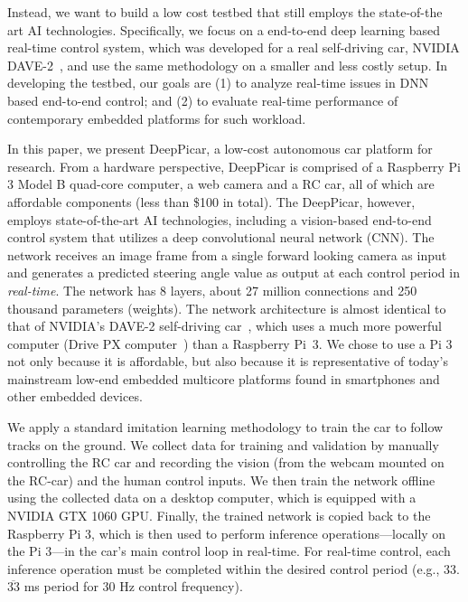 Instead, we want to build a low cost testbed that still employs the
state-of-the art AI technologies. Specifically, we focus on a end-to-end
deep learning based real-time control system,
which was developed for a real self-driving car, NVIDIA
DAVE-2~\cite{Bojarski2016}, and use the same methodology on a
smaller and less costly setup. In developing the testbed, our
goals are (1) to analyze real-time issues in DNN based end-to-end
control; and (2) to evaluate real-time performance of contemporary embedded
platforms for such workload.

In this paper, we present DeepPicar, a low-cost autonomous car
platform for research. From a hardware perspective,
DeepPicar is comprised of a Raspberry Pi 3 Model B quad-core
computer, a web camera and a RC car, all of which are affordable
components (less than \$100 in total).
The DeepPicar, however, employs state-of-the-art AI
technologies, including a vision-based end-to-end control system that
utilizes a deep convolutional neural network (CNN).
The network receives an image frame from a single forward
looking camera as input and generates a predicted steering angle
value as output at each control period in \emph{real-time}.
The network has 8 layers, about 27 million connections
and 250 thousand parameters (weights).
The network architecture is almost identical to that of NVIDIA's DAVE-2
self-driving car~\cite{Bojarski2016}, which uses a much more powerful
computer (Drive PX computer~\cite{drivepx}) than a Raspberry Pi~3.
We chose to use a Pi 3 not only because it is affordable, but also because it is representative
of today's mainstream low-end embedded multicore platforms found in
smartphones and other embedded devices.


We apply a standard imitation learning methodology to train the car to
follow tracks on the ground. We collect data for
training and validation by manually
controlling the RC car and recording the vision (from the webcam
mounted on the RC-car) and the human control inputs. We then train the
network offline using the collected data on a desktop computer, which
is equipped with a NVIDIA GTX 1060 GPU. Finally, the trained network is copied
back to the Raspberry Pi 3, which is then used to perform inference
operations---locally on the Pi 3---in the car's main control loop in
real-time. For real-time control, each inference operation must
be completed within the desired control period (e.g., 33.$\overline{\mbox{33}}$ ms
 period for 30 Hz control frequency).

